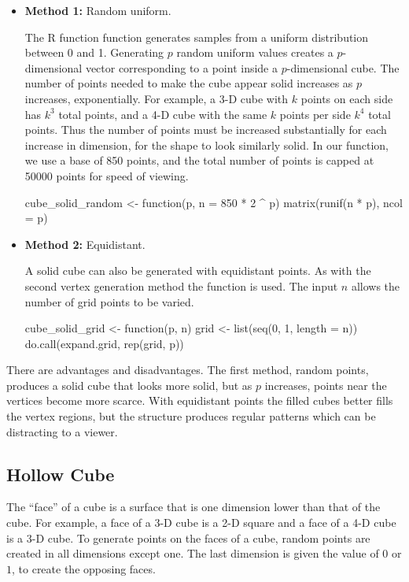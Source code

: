 \begin{itemize}

  \item {\bf Method 1:} Random uniform.

    The R function  function generates samples from a
    uniform distribution between 0 and 1. Generating $p$ random
    uniform values creates a $p$-dimensional vector corresponding to a
    point inside a $p$-dimensional cube. The number of points needed
    to make the cube appear solid increases as $p$ increases, exponentially.  For example, a 3-D
    cube with $k$ points on each side has  $k^3$ total points, and a 4-D cube
    with the same $k$ points per side $k^4$ total points. Thus the number
    of points must be increased substantially for each increase in
    dimension, for the shape to look similarly solid. In our function, we use a base of 850 points, and the total
    number of points is capped at 50000 points for speed of viewing.

\begin{example}
cube_solid_random <- function(p, n = 850 * 2 ^ p) {
  matrix(runif(n * p), ncol = p)
}
\end{example}

  \item {\bf Method 2:} Equidistant.

    A solid cube can also be generated with equidistant points. As
    with the second vertex generation method the 
    function is used. The input $n$ allows the number of grid points
    to be varied.

\begin{example}
cube_solid_grid <- function(p, n) {
  grid <- list(seq(0, 1, length = n))
  do.call(expand.grid, rep(grid, p))
}
\end{example}
\end{itemize}

There are advantages and disadvantages.  The first method, random
points, produces a solid cube that looks more solid, but as $p$
increases, points near the vertices become more scarce.  With
equidistant points the filled cubes better fills the vertex regions, but the structure  produces regular patterns which can be distracting to a viewer.

\subsection{Hollow Cube}

The ``face'' of a cube is a surface that is one dimension lower than
that of the cube.  For example, a face of a 3-D cube is a 2-D square
and a face of a 4-D cube is a 3-D cube. To generate points on the
faces of a cube, random points are created in all dimensions except
one. The last dimension is given the value of $0$ or $1$, to create
the opposing faces.

